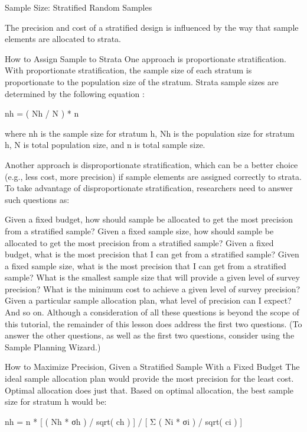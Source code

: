 Sample Size: Stratified Random Samples

The precision and cost of a stratified design is influenced by the way that sample elements are allocated to strata.

How to Assign Sample to Strata
One approach is proportionate stratification. With proportionate stratification, the sample size of each stratum is proportionate to the population size of the stratum. Strata sample sizes are determined by the following equation :

nh = ( Nh / N ) * n

where nh is the  sample size for stratum h, Nh is the population size for stratum h, N is total population size, and n is total sample size.

Another approach is disproportionate stratification, which can be a better choice (e.g., less cost, more precision) if sample elements are assigned correctly to strata. To take advantage of disproportionate stratification, researchers need to answer such questions as:

Given a fixed budget, how should sample be allocated to get the most precision from a stratified sample?
Given a fixed sample size, how should sample be allocated to get the most precision from a stratified sample?
Given a fixed budget, what is the most precision that I can get from a stratified sample?
Given a fixed sample size, what is the most precision that I can get from a stratified sample?
What is the smallest sample size that will provide a given level of survey precision?
What is the minimum cost to achieve a given level of survey precision?
Given a particular sample allocation plan, what level of precision can I expect?
And so on.
Although a consideration of all these questions is beyond the scope of this tutorial, the remainder of this lesson does address the first two questions. (To answer the other questions, as well as the first two questions, consider using the Sample Planning Wizard.)



How to Maximize Precision, Given a Stratified Sample With a Fixed Budget
The ideal sample allocation plan would provide the most precision for the least cost. Optimal allocation does just that. Based on optimal allocation, the best sample size for stratum h would be:

nh = n * [ ( Nh * σh ) / sqrt( ch ) ] / [ Σ ( Ni * σi ) / sqrt( ci ) ]


